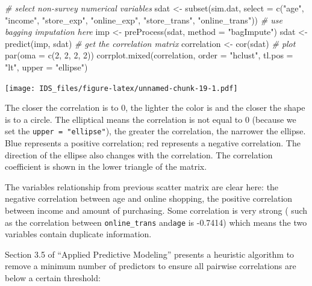 \documentclass[
  12pt,
]{krantz}
\makeatletter
\newenvironment{Shaded}{\begin{snugshade}}{\end{snugshade}}
\newcommand{\AttributeTok}[1]{\textcolor[rgb]{0.61,0.61,0.61}{#1}}
\newcommand{\CommentTok}[1]{\textcolor[rgb]{0.37,0.37,0.37}{\textit{#1}}}
\newcommand{\DecValTok}[1]{\textcolor[rgb]{0.06,0.06,0.06}{#1}}
\newcommand{\FunctionTok}[1]{\textcolor[rgb]{0,0,0}{#1}}
\newcommand{\NormalTok}[1]{#1}
\newcommand{\OtherTok}[1]{\textcolor[rgb]{0.37,0.37,0.37}{#1}}
\newcommand{\StringTok}[1]{\textcolor[rgb]{0.5,0.5,0.5}{#1}}
\newenvironment{kframe}{%
\medskip{}
\setlength{\fboxsep}{.8em}
 \def\at@end@of@kframe{}%
 \ifinner\ifhmode%
  \def\at@end@of@kframe{\end{minipage}}%
  \begin{minipage}{\columnwidth}%
 \fi\fi%
 \def\FrameCommand##1{\hskip\@totalleftmargin \hskip-\fboxsep
 \colorbox{shadecolor}{##1}\hskip-\fboxsep
     \hskip-\linewidth \hskip-\@totalleftmargin \hskip\columnwidth}%
 \MakeFramed {\advance\hsize-\width
   \@totalleftmargin\z@ \linewidth\hsize
   \@setminipage}}%
 {\par\unskip\endMakeFramed%
 \at@end@of@kframe}
\renewenvironment{Shaded}{\begin{kframe}}{\end{kframe}}
\makeatother
\begin{document}
\begin{Shaded}
\begin{Highlighting}[]
\CommentTok{\# select non{-}survey numerical variables}
\NormalTok{sdat }\OtherTok{\textless{}{-}} \FunctionTok{subset}\NormalTok{(sim.dat, }\AttributeTok{select =} \FunctionTok{c}\NormalTok{(}\StringTok{"age"}\NormalTok{, }\StringTok{"income"}\NormalTok{, }\StringTok{"store\_exp"}\NormalTok{, }
    \StringTok{"online\_exp"}\NormalTok{, }\StringTok{"store\_trans"}\NormalTok{, }\StringTok{"online\_trans"}\NormalTok{))}
\CommentTok{\# use bagging imputation here}
\NormalTok{imp }\OtherTok{\textless{}{-}} \FunctionTok{preProcess}\NormalTok{(sdat, }\AttributeTok{method =} \StringTok{"bagImpute"}\NormalTok{)}
\NormalTok{sdat }\OtherTok{\textless{}{-}} \FunctionTok{predict}\NormalTok{(imp, sdat)}
\CommentTok{\# get the correlation matrix}
\NormalTok{correlation }\OtherTok{\textless{}{-}} \FunctionTok{cor}\NormalTok{(sdat)}
\CommentTok{\# plot}
\FunctionTok{par}\NormalTok{(}\AttributeTok{oma =} \FunctionTok{c}\NormalTok{(}\DecValTok{2}\NormalTok{, }\DecValTok{2}\NormalTok{, }\DecValTok{2}\NormalTok{, }\DecValTok{2}\NormalTok{))}
\FunctionTok{corrplot.mixed}\NormalTok{(correlation, }\AttributeTok{order =} \StringTok{"hclust"}\NormalTok{, }\AttributeTok{tl.pos =} \StringTok{"lt"}\NormalTok{, }
    \AttributeTok{upper =} \StringTok{"ellipse"}\NormalTok{)}
\end{Highlighting}
\end{Shaded}

\texttt{[image: IDS\_files/figure-latex/unnamed-chunk-19-1.pdf]}

The closer the correlation is to 0, the lighter the color is and the closer the shape is to a circle. The elliptical means the correlation is not equal to 0 (because we set the \texttt{upper\ =\ "ellipse"}), the greater the correlation, the narrower the ellipse. Blue represents a positive correlation; red represents a negative correlation. The direction of the ellipse also changes with the correlation. The correlation coefficient is shown in the lower triangle of the matrix.

The variables relationship from previous scatter matrix are clear here: the negative correlation between age and online shopping, the positive correlation between income and amount of purchasing. Some correlation is very strong ( such as the correlation between \texttt{online\_trans} and\texttt{age} is -0.7414) which means the two variables contain duplicate information.

Section 3.5 of ``Applied Predictive Modeling'' \citep{APM} presents a heuristic algorithm to remove a minimum number of predictors to ensure all pairwise correlations are below a certain threshold:
\end{document}

